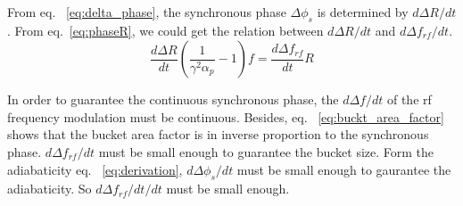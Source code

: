 \begin{itemize}
From eq. ~\ref{eq:delta_phase}, the synchronous phase $\Delta\phi_s$ is determined by $d\Delta R/dt$. From eq.~\ref{eq:phaseR}, we could get the relation between $d\Delta R/dt$ and $d\Delta f_{\mathit{rf}}/dt$.
\begin{equation}
\frac{d\Delta R}{dt}(\frac{1}{\gamma^2\alpha_p}-1)f=\frac{d\Delta f_{\mathit{rf}}}{dt} R
\label{eq:RtoF}
\end{equation}

In order to guarantee the continuous synchronous phase, the $d\Delta f/dt$ of the rf frequency modulation must be continuous. Besides, eq. ~\ref{eq:buckt_area_factor} shows that the bucket area factor is in inverse proportion to the synchronous phase. $d\Delta f_{\mathit{rf}}/dt$ must be small enough to guarantee the bucket size. Form the adiabaticity eq. ~\ref{eq:derivation}, $d\Delta \phi_s/dt$ must be small enough to gaurantee the adiabaticity. So $d\Delta f_{\mathit{rf}}/dt/dt$ must be small enough.
\end{itemize}

%
%
%
%
%
%
%
%

